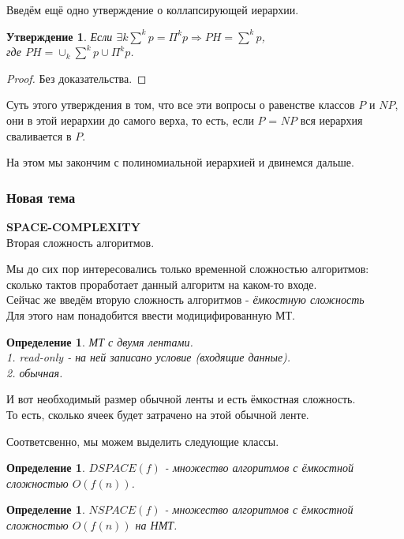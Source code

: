 \documentclass{beamer}
\theoremstyle{plain}
\newtheorem{state}[thm]{Утверждение}
\newtheorem{dfn}[thm]{Определение}
\theoremstyle{definition}
\begin{document}
\begin{frame}
    Введём ещё одно утверждение о коллапсирующей иерархии.
    \begin{state}
        Если $\exists k \sum^kp = \Pi^kp \Rightarrow PH = \sum^kp$, \\
        где $PH = \cup_k\sum^kp\cup \Pi^kp$.
    \end{state}
    \begin{proof}
        Без доказательства.
    \end{proof}
    Суть этого утверждения в том, что все эти вопросы о равенстве классов
    $P$ и $NP$, они в этой иерархии до самого верха, то есть, если $P$ = $NP$
    вся иерархия сваливается в $P$. \\
\end{frame}

\begin{frame}
    \begin{center}
        На этом мы закончим с полиномиальной иерархией и двинемся дальше.
    \end{center}
\end{frame}

\begin{frame}
    \frametitle{Новая тема}
    \begin{center}
        \textbf{SPACE-COMPLEXITY} \\
        Вторая сложность алгоритмов.
    \end{center}
\end{frame}

\begin{frame}
    Мы до сих пор интересовались только временной сложностью алгоритмов: сколько тактов проработает данный алгоритм на каком-то входе. \\
    Сейчас же введём вторую сложность алгоритмов - \textit{ёмкостную сложность} \\
    Для этого нам понадобится ввести модицифированную МТ.
    \begin{dfn}
        МТ с двумя лентами. \\
        1. read-only - на ней записано условие (входящие данные). \\
        2. обычная.
    \end{dfn}
    И вот необходимый размер обычной ленты и есть ёмкостная сложность. \\
    То есть, сколько ячеек будет затрачено на этой обычной ленте.
\end{frame}

\begin{frame}
    Соответсвенно, мы можем выделить следующие классы.
    \begin{dfn}
        $DSPACE(f)$ - множество алгоритмов с ёмкостной сложностью $O(f(n))$.
    \end{dfn}
    \begin{dfn}
        $NSPACE(f)$ - множество алгоритмов с ёмкостной сложностью $O(f(n))$ на
        НМТ.
    \end{dfn}
\end{frame}
\end{document}
